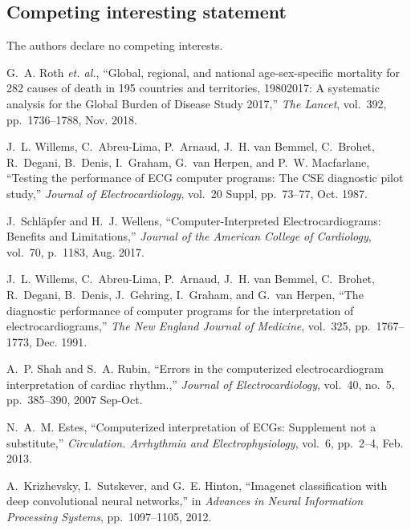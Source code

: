 \documentclass{article}
\begin{document}
\subsection*{Competing interesting statement}
The authors declare no competing interests.

\begin{thebibliography}{10}

G.~A. Roth \textit{et. al.}, ``Global,
  regional, and national age-sex-specific mortality for 282 causes of death in
  195 countries and territories, 1980\textendash{}2017: A systematic analysis
  for the {{Global Burden}} of {{Disease Study}} 2017,'' {\em The Lancet},
  vol.~392, pp.~1736--1788, Nov. 2018.

J.~L. Willems, C.~{Abreu-Lima}, P.~Arnaud, J.~H. {van Bemmel}, C.~Brohet,
  R.~Degani, B.~Denis, I.~Graham, G.~{van Herpen}, and P.~W. Macfarlane,
  ``Testing the performance of {{ECG}} computer programs: The {{CSE}}
  diagnostic pilot study,'' {\em Journal of Electrocardiology}, vol.~20 Suppl,
  pp.~73--77, Oct. 1987.

J.~Schl\"apfer and H.~J. Wellens, ``Computer-{{Interpreted
  Electrocardiograms}}: {{Benefits}} and {{Limitations}},'' {\em Journal of the
  American College of Cardiology}, vol.~70, p.~1183, Aug. 2017.

J.~L. Willems, C.~{Abreu-Lima}, P.~Arnaud, J.~H. {van Bemmel}, C.~Brohet,
  R.~Degani, B.~Denis, J.~Gehring, I.~Graham, and G.~{van Herpen}, ``The
  diagnostic performance of computer programs for the interpretation of
  electrocardiograms,'' {\em The New England Journal of Medicine}, vol.~325,
  pp.~1767--1773, Dec. 1991.

A.~P. Shah and S.~A. Rubin, ``Errors in the computerized electrocardiogram
  interpretation of cardiac rhythm.,'' {\em Journal of Electrocardiology},
  vol.~40, no.~5, pp.~385--390, 2007 Sep-Oct.

N.~A.~M. Estes, ``Computerized interpretation of {{ECGs}}: Supplement not a
  substitute,'' {\em Circulation. Arrhythmia and Electrophysiology}, vol.~6,
  pp.~2--4, Feb. 2013.

A.~Krizhevsky, I.~Sutskever, and G.~E. Hinton, ``Imagenet classification with
  deep convolutional neural networks,'' in {\em Advances in {{Neural
  Information Processing Systems}}}, pp.~1097--1105, 2012.


\end{thebibliography}
\end{document}
